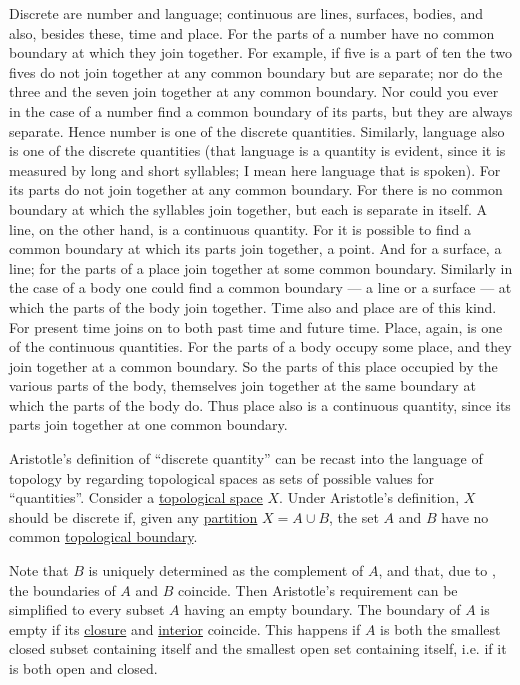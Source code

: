 \begin{concept}
\begin{displayquote}
    Discrete are number and language; continuous are lines, surfaces, bodies, and also, besides these, time and place. For the parts of a number have no common boundary at which they join together. For example, if five is a part of ten the two fives do not join together at any common boundary but are separate; nor do the three and the seven join together at any common boundary. Nor could you ever in the case of a number find a common boundary of its parts, but they are always separate. Hence number is one of the discrete quantities. Similarly, language also is one of the discrete quantities (that language is a quantity is evident, since it is measured by long and short syllables; I mean here language that is spoken). For its parts do not join together at any common boundary. For there is no common boundary at which the syllables join together, but each is separate in itself. A line, on the other hand, is a continuous quantity. For it is possible to find a common boundary at which its parts join together, a point. And for a surface, a line; for the parts of a place join together at some common boundary. Similarly in the case of a body one could find a common boundary --- a line or a surface --- at which the parts of the body join together. Time also and place are of this kind. For present time joins on to both past time and future time. Place, again, is one of the continuous quantities. For the parts of a body occupy some place, and they join together at a common boundary. So the parts of this place occupied by the various parts of the body, themselves join together at the same boundary at which the parts of the body do. Thus place also is a continuous quantity, since its parts join together at one common boundary.
  \end{displayquote}

  Aristotle's definition of \enquote{discrete quantity} can be recast into the language of topology by regarding topological spaces as sets of possible values for \enquote{quantities}. Consider a \hyperref[def:topological_space]{topological space} \( X \). Under Aristotle's definition, \( X \) should be discrete if, given any \hyperref[def:set_partition]{partition} \( X = A \cup B \), the set \( A \) and \( B \) have no common \hyperref[def:topological_boundary_operator]{topological boundary}.

  Note that \( B \) is uniquely determined as the complement of \( A \), and that, due to , the boundaries of \( A \) and \( B \) coincide. Then Aristotle's requirement can be simplified to every subset \( A \) having an empty boundary. The boundary of \( A \) is empty if its \hyperref[def:topological_closure_operator]{closure} and \hyperref[def:topological_interior_operator]{interior} coincide. This happens if \( A \) is both the smallest closed subset containing itself and the smallest open set containing itself, i.e. if it is both open and closed.


\end{concept}
